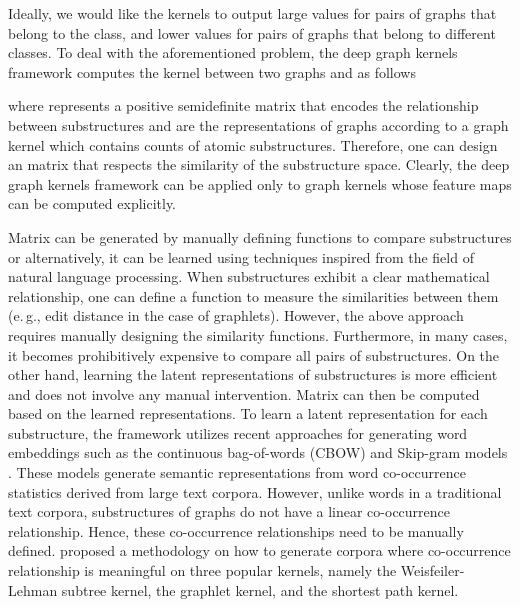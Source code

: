 \documentclass[twoside,11pt]{article}
\newcommand{\eg}{e.\,g., }
\begin{document}
Ideally, we would like the kernels to output large values for pairs of graphs that belong to the class, and lower values for pairs of graphs that belong to different classes.
To deal with the aforementioned problem, the deep graph kernels framework computes the kernel between two graphs  and  as follows

where  represents a positive semidefinite matrix that encodes the relationship between substructures and  are the representations of graphs  according to a graph kernel which contains counts of atomic substructures.
Therefore, one can design an  matrix that respects the similarity of the substructure space.
Clearly, the deep graph kernels framework can be applied only to graph kernels whose feature maps  can be computed explicitly.

Matrix  can be generated by manually defining functions to compare substructures or alternatively, it can be learned using techniques inspired from the field of natural language processing.
When substructures exhibit a clear mathematical relationship, one can define a function to measure the similarities between them (\eg edit distance in the case of graphlets).
However, the above approach requires manually designing the similarity functions.
Furthermore, in many cases, it becomes prohibitively expensive to compare all pairs of substructures.
On the other hand, learning the latent representations of substructures is more efficient and does not involve any manual intervention.
Matrix  can then be computed based on the learned representations.
To learn a latent representation for each substructure, the framework utilizes recent approaches for generating word embeddings such as the continuous bag-of-words (CBOW) and Skip-gram models .
These models generate semantic representations from word co-occurrence statistics derived from large text corpora.
However, unlike words in a traditional text corpora, substructures of graphs do not have a linear co-occurrence relationship.
Hence, these co-occurrence relationships need to be manually defined. 
 proposed a methodology on how to generate corpora where co-occurrence relationship is meaningful on three popular kernels, namely the Weisfeiler-Lehman subtree kernel, the graphlet kernel, and the shortest path kernel.
\end{document}
